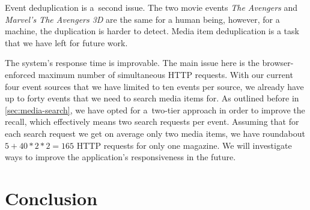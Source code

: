 \documentclass{acm_proc_article-sp}
\let\oldemph\emph
\renewcommand{\emph}[1]{\oldemph{\fontsize{9}{9}\selectfont #1}}
\begin{document}
Event deduplication is a~second issue.
The two movie events \emph{The Avengers} and
\emph{Marvel's The Avengers 3D} are the same for a human being,
however, for a machine, the duplication is harder to detect.
Media item deduplication is a task that we have left for future work.

The system's response time is improvable.
The main issue here is the browser-enforced maximum number
of simultaneous HTTP requests.
With our current four event sources that we have limited
to ten events per source, we already have up to forty events
that we need to search media items for.
As outlined before in \autoref{sec:media-search},
we have opted for a~two-tier approach in order to improve the recall,
which effectively means two search requests per event.
Assuming that for each search request we get on average only two media items,
we have roundabout $5+40*2*2=165$ HTTP requests for only one magazine.
We will investigate ways to improve the application's responsiveness
in the future.

\section{Conclusion}






\balancecolumns
\end{document}
